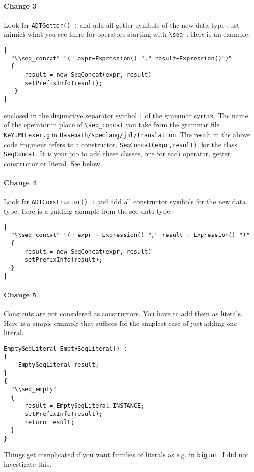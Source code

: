 \documentclass[11pt]{article}
\begin{document}
\paragraph{\quad Change 3}
Look for \verb+ADTGetter() :+ and  add all getter symbols 
of the new data type 
Just mimick what you see there for operators starting with \verb+\seq_+.
Here is an example:
\begin{verbatim}
|
  "\\seq_concat" "(" expr=Expression() "," result=Expression()")"
  {
      result = new SeqConcat(expr, result)
      setPrefixInfo(result);
   }
|
\end{verbatim}
enclosed in the disjunctive separator symbol \verb+|+ of the grammar syntax.
The name of the operator in place of \verb+\seq_concat+ you take from the
grammar file \verb+KeYJMLLexer.g+ in \verb+Basepath/speclang/jml/translation+.
The result in the above code fragment refers to a 
constructor, \verb+SeqConcat(expr,result)+, for the class 
\verb+SeqConcat+. 
It is your job to add these classes, one for each operator, 
getter, constructor or literal. See  below.
\paragraph{\quad Change 4}
Look for \verb+ADTConstructor() :+ and add all constructor symbols for the new data type.
Here is a guiding example from the seq data type:
\begin{verbatim}
|
  "\\seq_concat" "(" expr = Expression() "," result = Expression() ")"
  {
      result = new SeqConcat(expr, result)
      setPrefixInfo(result);
  }
|
\end{verbatim}
\paragraph{\quad Change 5}
Constants are not considered as constructors. You have to add them as literals.
Here is a simple example that suffices for the simplest case of just adding one literal.
\begin{verbatim}
EmptySeqLiteral EmptySeqLiteral() :
{
    EmptySeqLiteral result;
}
{
  "\\seq_empty"
  {
      result = EmptySeqLiteral.INSTANCE;
      setPrefixInfo(result);
      return result;
  }
}
\end{verbatim}
Things get complicated if you want families of literals as e.g. in \verb+bigint+. I did not investigate this.
\end{document}
